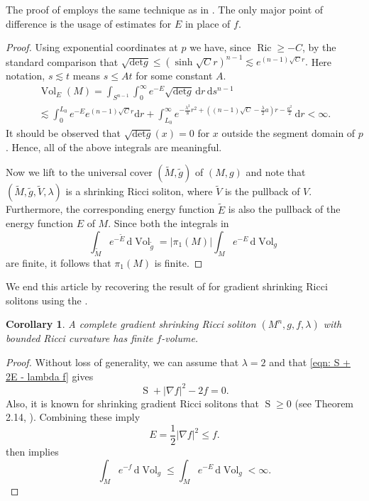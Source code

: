 \documentclass{amsart}
\newcommand{\abs}[1]{\left| #1 \right|}
\newcommand{\derivative}{\mathrm{d}}
\DeclareMathOperator*{\ricci}{Ric}
\DeclareMathOperator*{\scalar}{S}
\DeclareMathOperator*{\Vol}{Vol}
\theoremstyle{plain}
\theoremstyle{plain}
\newtheorem{corollary}{Corollary}
\theoremstyle{plain}
\theoremstyle{plain}
\theoremstyle{remark}
\begin{document}
The proof of  employs the same technique as in \cite{naber2006geometryanalysisriccisolitons}. 
The only major point of difference is the usage of estimates for $E$ in place of $f$. 
\shrinkingRShasfiniteEVolume*
\begin{proof}
	Using exponential coordinates at $p$ we have, since $\ricci\geq -C$, by the standard comparison that 
	$\sqrt{ \mathrm{det} g} \leq (\sinh \sqrt{C} r)^{n-1} \lesssim e^{(n-1)\sqrt{C} r} . $ Here  notation, $s\lesssim t$ means $s \leq At$ for some constant $A$. 
	\begin{multline*}
		{\Vol}_E (M) = \int_{S^{n-1}} \int_0^\infty e^{-E} \sqrt{\mathrm{det} g} \, \derivative r \, \derivative s^{n-1} \\ 
		\lesssim \int_0^{L_0} e^{-E} e^{(n-1)\sqrt{C} r} \derivative r + 
		\int_{L_0}^\infty e^{ -\frac{\lambda^2}{8}r^2 + \left( (n-1)\sqrt{C} -\frac{\lambda}{2} a \right) r - \frac{a^2}{2} } \, \derivative r < \infty .
	\end{multline*}
 It should be observed  that  $\sqrt{ \mathrm{det} g}(x) = 0$ for $x$ outside the segment domain of $p$.  	
Hence, all of the above integrals  are meaningful. 


Now we lift to the universal cover $ (\tilde{M}, \tilde{g} ) $ of $(M,g)$ and note that $ ( \tilde{M}, \tilde{g} , \tilde{V}, \lambda )$ is a shrinking Ricci soliton, where $\tilde{V}$ is the pullback of $V$.
Furthermore, the corresponding energy function $\tilde{E}$ is also the pullback of the energy function $E$ of $M$. 
Since both the integrals in
\begin{equation*}
	\int_{\tilde{M}} e^{-\tilde{E}} \, \derivative {\Vol}_{\tilde{g}}  = 
		\abs{ \pi_1(M) } \int_M e^{-E} \, \derivative {\Vol}_g 
\end{equation*}
are finite, it follows that $ \pi_1(M)$ is finite.
\end{proof}
We end this article by recovering the result of \cite{naber2006geometryanalysisriccisolitons} for gradient shrinking Ricci solitons using the .

\begin{corollary}\label{cor: shrinking GRS has finite f volume}
	A complete gradient shrinking Ricci soliton $(M^n,g, f,\lambda)$ with bounded Ricci curvature has finite $f$-volume.
\end{corollary}
\begin{proof}
	Without loss of generality, we can assume that $\lambda = 2$ and that \cref{eqn: S + 2E - lambda f} gives
	$$ \scalar + \abs{\nabla f}^2 - 2 f = 0 .$$
	Also, it is known for shrinking gradient Ricci solitons that $\scalar \geq 0$ (see Theorem 2.14, \cite{MR4624811}). Combining these imply 
	$$ E = \frac{1}{2} \abs{ \nabla f }^2 \leq f .$$
	 then implies
	$$ \int_M e^{-f} \,\derivative {\Vol}_g \leq \int_M e^{-E} \,\derivative {\Vol}_g < \infty . $$
\end{proof}
\end{document}
